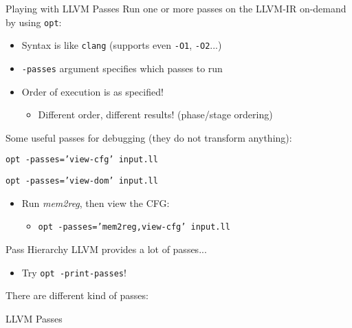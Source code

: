 \begin{frame}{Playing with LLVM Passes}
Run one or more passes on the LLVM-IR on-demand by using \texttt{opt}:

\begin{itemize}
\item Syntax is like \texttt{clang} (supports even \texttt{-O1}, \texttt{-O2}...)
\item \texttt{-passes} argument specifies which passes to run
\item Order of execution is as specified!
\begin{itemize}
\item Different order, different results! (\alert{phase/stage ordering})
\end{itemize}
\end{itemize}

\vfill
Some useful passes for debugging (they do not transform anything):

{\small
\begin{description}
\item[print CFG] \texttt{opt -passes='view-cfg' input.ll}
\item[print dominator tree] \texttt{opt -passes='view-dom' input.ll}
\end{description}
}

\vfill
\begin{example}
\begin{itemize}
\item Run \emph{mem2reg}, then view the CFG:
\begin{itemize}
\item \texttt{opt -passes='mem2reg,view-cfg' input.ll}
\end{itemize}
\end{itemize}
\end{example}
\end{frame}


\begin{frame}{Pass Hierarchy}
LLVM provides a lot of passes...

\begin{itemize}
\item Try \texttt{opt -print-passes}!
\end{itemize}

\vfill
There are different kind of passes:

\begin{block}{LLVM Passes}

\centering
\end{block}
\end{frame}


